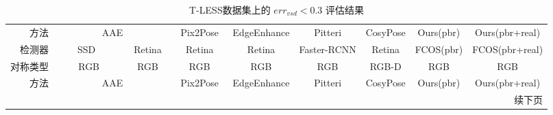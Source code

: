         {
        \scriptsize
        \begin{longtable}{r| c c c c c c c c}
        \caption{T-LESS数据集上的 $err_{vsd} < 0.3$ 评估结果} \label{tab:tless_vsd} \\
        \toprule
        方法& \multicolumn{2}{c}{AAE \cite{sundermeyer2018implicit}} & Pix2Pose \cite{park2019pix2pose}& EdgeEnhance \cite{wen2020edge}& Pitteri\cite{pitteri2019object} & CosyPose\cite{labbe2020cosypose}& Ours(pbr) & Ours(pbr+real)\\
        \cmidrule(lr){2-3}\cmidrule(lr){4-4}\cmidrule(lr){5-5}\cmidrule(lr){6-6}\cmidrule(lr){7-7}\cmidrule(lr){8-9}
        检测器&\ \ \ \ SSD\ \ \ \ \  &\ Retina\ &\ \ Retina\ \ &\ \ Retina\ \ & Faster-RCNN & Retina & FCOS(pbr) & FCOS(pbr+real)\\
        对称类型& RGB & RGB & RGB &RGB& RGB &RGB-D& RGB &RGB \\
        \midrule
        \endfirsthead

        \toprule
        方法 & \multicolumn{2}{c}{AAE \cite{sundermeyer2018implicit}} & Pix2Pose \cite{park2019pix2pose} & EdgeEnhance \cite{wen2020edge} & Pitteri \cite{pitteri2019object} & CosyPose \cite{labbe2020cosypose} & Ours(pbr) & Ours(pbr+real) \\
        \midrule
        \endhead

        \midrule
        \multicolumn{9}{r}{续下页}
        \endfoot

        \bottomrule
        \endlastfoot


\end{longtable}}
